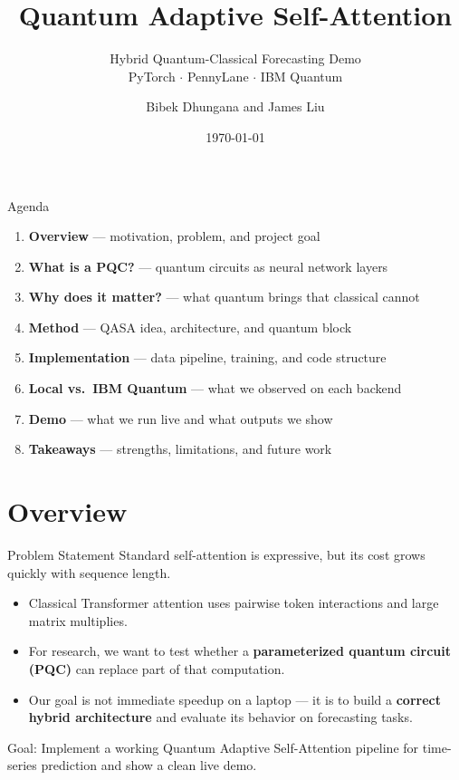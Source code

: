 \documentclass[aspectratio=169,professionalfonts]{beamer}
\title{Quantum Adaptive Self-Attention}
\subtitle{Hybrid Quantum-Classical Forecasting Demo\\PyTorch $\cdot$ PennyLane $\cdot$ IBM Quantum}
\author{Bibek Dhungana and James Liu}
\institute{Final Project Demo}
\date{\today}
\begin{document}
\maketitle

\begin{frame}{Agenda}
\begin{enumerate}
  \item \textbf{Overview} --- motivation, problem, and project goal
  \item \textbf{What is a PQC?} --- quantum circuits as neural network layers
  \item \textbf{Why does it matter?} --- what quantum brings that classical cannot
  \item \textbf{Method} --- QASA idea, architecture, and quantum block
  \item \textbf{Implementation} --- data pipeline, training, and code structure
  \item \textbf{Local vs.\ IBM Quantum} --- what we observed on each backend
  \item \textbf{Demo} --- what we run live and what outputs we show
  \item \textbf{Takeaways} --- strengths, limitations, and future work
\end{enumerate}
\end{frame}

\section{Overview}

\begin{frame}{Problem Statement}
\Large
Standard self-attention is expressive, but its cost grows quickly with sequence length.

\vspace{0.8em}
\normalsize
\begin{itemize}
  \item Classical Transformer attention uses pairwise token interactions and large matrix multiplies.
  \item For research, we want to test whether a \textbf{parameterized quantum circuit (PQC)} can replace part of that computation.
  \item Our goal is not immediate speedup on a laptop --- it is to build a \textbf{correct hybrid architecture} and evaluate its behavior on forecasting tasks.
\end{itemize}

\vspace{0.8em}
\alert{Goal:} Implement a working Quantum Adaptive Self-Attention pipeline for time-series prediction and show a clean live demo.
\end{frame}
\end{document}
